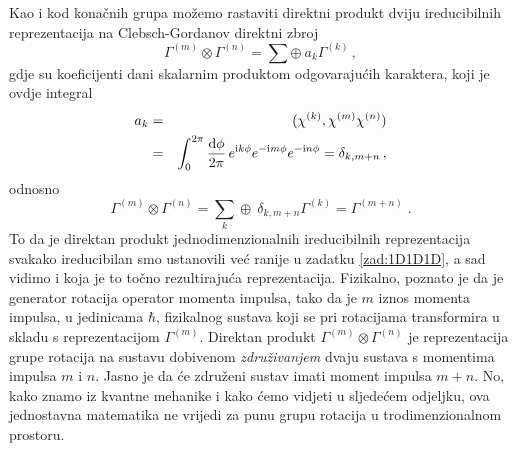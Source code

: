 Kao i kod konačnih grupa možemo rastaviti direktni produkt dviju
ireducibilnih reprezentacija na Clebsch-Gordanov direktni zbroj
\begin{displaymath}
  \Gamma^{(m)}\otimes\Gamma^{(n)} =
  \sum \oplus\: a_{k}\Gamma^{(k)}  \,,
\end{displaymath}
gdje su koeficijenti dani skalarnim produktom odgovarajućih karaktera,
koji je ovdje integral
\begin{eqnarray*}
a_{k} & = & (\chi^{(k)}, \chi^{(m)}\chi^{(n)}) \\
      & = & \int_{0}^{2\pi}\frac{\textrm{d} \phi}{2\pi}\,
    e^{\textrm{\scriptsize i} k \phi}e^{-\textrm{\scriptsize i} m \phi}e^{-\textrm{\scriptsize i} n \phi} = \delta_{k,m+n} \,,
\end{eqnarray*}
odnosno
\begin{displaymath}
  \Gamma^{(m)}\otimes\Gamma^{(n)} =
  \sum_{k} \oplus\: \delta_{k,m+n}\Gamma^{(k)} = \Gamma^{(m+n)} \;.
\end{displaymath}
To da je direktan produkt jednodimenzionalnih ireducibilnih reprezentacija svakako
ireducibilan smo ustanovili već ranije u zadatku \ref{zad:1D1D1D}, a sad vidimo i koja je
to točno rezultirajuća reprezentacija. Fizikalno, poznato je da je generator
rotacija operator momenta impulsa, tako da je $m$ iznos momenta impulsa,
u jedinicama $\hbar$, fizikalnog sustava koji se pri rotacijama transformira
u skladu s reprezentacijom $\Gamma^{(m)}$. Direktan produkt $\Gamma^{(m)}\otimes\Gamma^{(n)}$
je reprezentacija grupe rotacija na sustavu dobivenom \emph{združivanjem} dvaju sustava 
s momentima impulsa $m$ i $n$. Jasno je da će združeni sustav imati moment impulsa $m+n$.
No, kako znamo iz kvantne mehanike i kako ćemo vidjeti u sljedećem odjeljku, ova
jednostavna matematika ne vrijedi za punu grupu rotacija u trodimenzionalnom prostoru.


